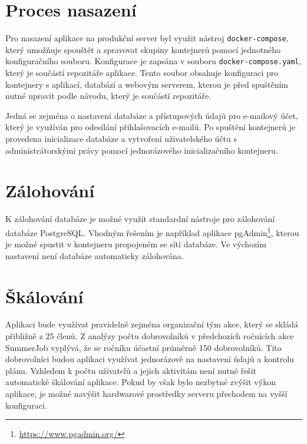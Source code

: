 \section{Proces nasazení}

Pro nasazení aplikace na produkční server byl využit nástroj \texttt{docker-compose}, který
umožňuje spouštět a spravovat skupiny kontejnerů pomocí jednotného konfiguračního souboru.
Konfigurace je zapsána v souboru \texttt{docker-compose.yaml}, který je součástí repozitáře aplikace.
Tento soubor obsahuje konfiguraci pro kontejnery s aplikací, databází a webovým serverem, kterou 
je před spuštěním nutné upravit podle návodu, který je součástí repozitáře.

Jedná se zejména o nastavení databáze a přístupových údajů pro e-mailový účet, který je využíván
pro odesílání přihlašovacích e-mailů. Po spuštění kontejnerů je provedena inicializace databáze
a vytvoření uživatelského účtu s administrátorskými právy pomocí jednorázového
inicializačního kontejneru.

\section{Zálohování}

K zálohování databáze je možné využít standardní nástroje pro zálohování databáze PostgreSQL.
Vhodným řešením je například aplikace pgAdmin\footnote{\url{https://www.pgadmin.org/}}, kterou
je možné spustit v kontejneru propojeném se sítí databáze.
Ve výchozím nastavení není databáze automaticky zálohována.

\section{Škálování}

 Aplikaci bude využívat
pravidelně zejména organizační tým akce, který se skládá přibližně z 25 členů. Z analýzy počtu dobrovolníků v předchozích ročnících akce SummerJob vyplývá, že
se ročníku účastní průměrně 150 dobrovolníků. Tito dobrovolníci budou aplikaci využívat jednorázově na nastavení údajů a kontrolu plánu.
Vzhledem k počtu uživatelů a jejich aktivitám není nutné řešit automatické škálování aplikace. Pokud by však bylo nezbytné
zvýšit výkon aplikace, je možné navýšit hardwarové prostředky serveru přechodem na vyšší konfiguraci.